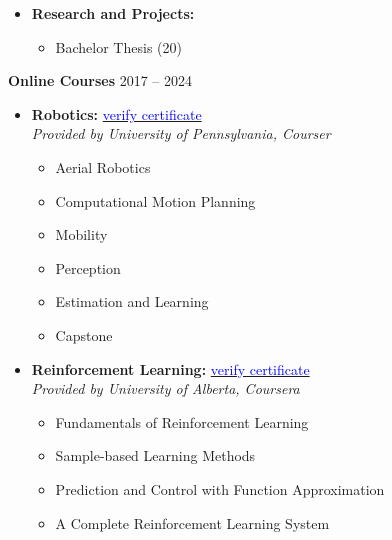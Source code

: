 \documentclass[12pt]{article}
\begin{document}
\begin{itemize}
    \item \textbf{Research and Projects:}\vspace{-4pt}
    \begin{multicols}{2}
    \begin{itemize}
        \item Bachelor Thesis (20)
    \end{itemize}
    \end{multicols}
\end{itemize}

\newpage
\noindent
{\bfseries Online Courses}
\hfill 2017 -- 2024\\

\begin{itemize} \itemsep -1pt
	\item \textbf{Robotics:}
	\hfill
	\href{https://coursera.org/share/169250f50fb50f44b803162274217f86}{\textcolor{blue}{verify certificate}}
	 \\
	\textit{Provided by University of Pennsylvania, Courser}
	\begin{multicols}{2}
		\begin{itemize}
			\item Aerial Robotics
			\item Computational Motion Planning
			\item Mobility
			\item Perception
			\item Estimation and Learning
			\item Capstone
		\end{itemize}
		\end{multicols}
	\item \textbf{Reinforcement Learning:}
	\hfill
	\href{https://www.coursera.org/account/accomplishments/specialization/LWJMD8VB28PZ?utm_source=link&utm_medium=certificate&utm_content=cert_image&utm_campaign=sharing_cta&utm_product=s12n}{\textcolor{blue}{verify certificate}}
	 \\
	\textit{Provided by University of Alberta, Coursera}
		\begin{itemize}
			\item Fundamentals of Reinforcement Learning
			\item Sample-based Learning Methods
			\item Prediction and Control with Function Approximation
			\item A Complete Reinforcement Learning System
		\end{itemize}

\end{itemize}
\end{document}
